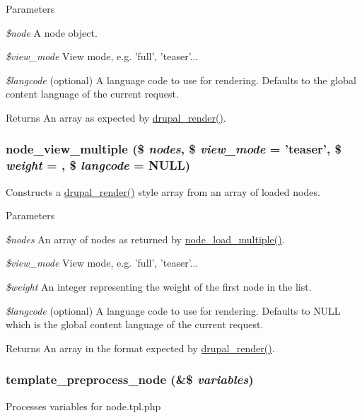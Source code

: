 \begin{DoxyParams}{Parameters}
\item[{\em \$node}]A node object. \item[{\em \$view\_\-mode}]View mode, e.g. 'full', 'teaser'... \item[{\em \$langcode}](optional) A language code to use for rendering. Defaults to the global content language of the current request.\end{DoxyParams}
\begin{DoxyReturn}{Returns}
An array as expected by \hyperlink{common_8inc_a05798b44e8d6c496d4bee5cc32fa7851}{drupal\_\-render()}. 
\end{DoxyReturn}
\hypertarget{node_8module_a2296e973f0df6c4c1961891b05c0d5d4}{
\subsubsection[{node\_\-view\_\-multiple}]{\setlength{\rightskip}{0pt plus 5cm}node\_\-view\_\-multiple (\$ {\em nodes}, \/  \$ {\em view\_\-mode} = {\ttfamily 'teaser'}, \/  \$ {\em weight} = {}, \/  \$ {\em langcode} = {\ttfamily NULL})}}
\label{node_8module_a2296e973f0df6c4c1961891b05c0d5d4}
Constructs a \hyperlink{common_8inc_a05798b44e8d6c496d4bee5cc32fa7851}{drupal\_\-render()} style array from an array of loaded nodes.


\begin{DoxyParams}{Parameters}
\item[{\em \$nodes}]An array of nodes as returned by \hyperlink{node_8module_a12f29f65250380f9e592d8d5497313e3}{node\_\-load\_\-multiple()}. \item[{\em \$view\_\-mode}]View mode, e.g. 'full', 'teaser'... \item[{\em \$weight}]An integer representing the weight of the first node in the list. \item[{\em \$langcode}](optional) A language code to use for rendering. Defaults to NULL which is the global content language of the current request.\end{DoxyParams}
\begin{DoxyReturn}{Returns}
An array in the format expected by \hyperlink{common_8inc_a05798b44e8d6c496d4bee5cc32fa7851}{drupal\_\-render()}. 
\end{DoxyReturn}
\hypertarget{node_8module_abba818ede4c18fb7d92f0a5d5f1aa771}{
\subsubsection[{template\_\-preprocess\_\-node}]{\setlength{\rightskip}{0pt plus 5cm}template\_\-preprocess\_\-node (\&\$ {\em variables})}}
\label{node_8module_abba818ede4c18fb7d92f0a5d5f1aa771}
Processes variables for node.tpl.php

